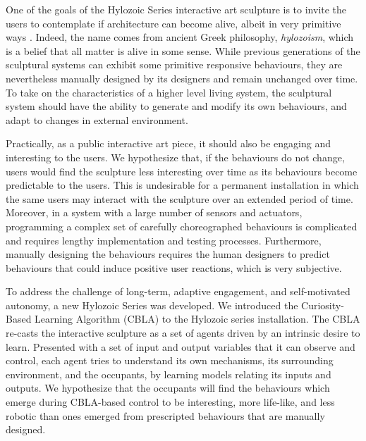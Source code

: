 One of the goals of the Hylozoic Series interactive art sculpture is to invite the users to contemplate if architecture can become alive, albeit in very primitive ways \cite{Beesley2012}. Indeed, the name comes from ancient Greek philosophy, \textit{hylozoism}, which is a belief that all matter is alive in some sense. While previous generations of the sculptural systems can exhibit some primitive responsive behaviours, they are nevertheless manually designed by its designers and remain unchanged over time. To take on the characteristics of a higher level living system, the sculptural system should have the ability to generate and modify its own behaviours, and adapt to changes in external environment.

Practically, as a public interactive art piece, it should also be engaging and interesting to the users. We hypothesize that, if the behaviours do not change, users would find the sculpture less interesting over time as its behaviours become predictable to the users. This is undesirable for a permanent installation in which the same users may interact with the sculpture over an extended period of time. 
Moreover, in a system with a large number of sensors and actuators, programming a complex set of carefully choreographed behaviours is complicated and requires lengthy implementation and testing processes. Furthermore, manually designing the behaviours requires the human designers to predict behaviours that could induce positive user reactions, which is very subjective. 

To address the challenge of long-term, adaptive engagement, and self-motivated autonomy, a new Hylozoic Series was developed. We introduced the Curiosity-Based Learning Algorithm (CBLA) to the Hylozoic series installation. The CBLA re-casts the interactive sculpture as a set of agents driven by an intrinsic desire to learn. Presented with a set of input and output variables that it can observe and control, each agent tries to understand its own mechanisms, its surrounding environment, and the occupants, by learning models relating its inputs and outputs. We hypothesize that the occupants will find the behaviours which emerge during CBLA-based control to be interesting, more life-like, and less robotic than ones emerged from prescripted behaviours that are manually designed. 

